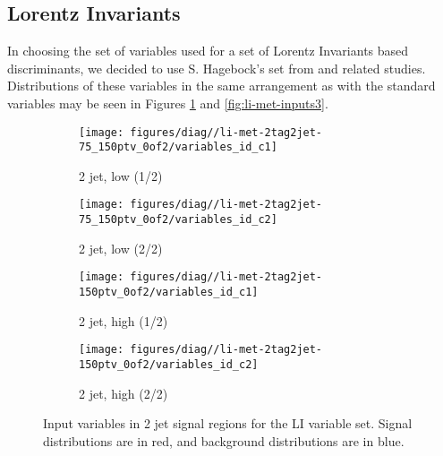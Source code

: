 \clearpage
\subsection{Lorentz Invariants}
In choosing the set of variables used for a set of Lorentz Invariants based discriminants, we decided to use S. Hagebock's set from \cite{litalk} and related studies.  Distributions of these variables in the same arrangement as with the standard variables may be seen in Figures \ref{fig:li-met-inputs2} and \ref{fig:li-met-inputs3}.
\begin{figure}[!htbp]\captionsetup{justification=centering}
  \centering
\begin{subfigure}[t]{0.49\textwidth}\centering\texttt{[image: figures/diag//li-met-2tag2jet-75\_150ptv\_0of2/variables\_id\_c1]}\caption{2 jet, low \ptv (1/2)}\end{subfigure}
\begin{subfigure}[t]{0.49\textwidth}\centering\texttt{[image: figures/diag//li-met-2tag2jet-75\_150ptv\_0of2/variables\_id\_c2]}\caption{2 jet, low \ptv (2/2)}\end{subfigure}
\begin{subfigure}[t]{0.49\textwidth}\centering\texttt{[image: figures/diag//li-met-2tag2jet-150ptv\_0of2/variables\_id\_c1]}\caption{2 jet, high \ptv (1/2)}\end{subfigure}
\begin{subfigure}[t]{0.49\textwidth}\centering\texttt{[image: figures/diag//li-met-2tag2jet-150ptv\_0of2/variables\_id\_c2]}\caption{2 jet, high \ptv (2/2)}\end{subfigure}
  \caption{Input variables in 2 jet signal regions for the LI variable set.  Signal distributions are in red, and background distributions are in blue.}
  \label{fig:li-met-inputs2}
\end{figure}
